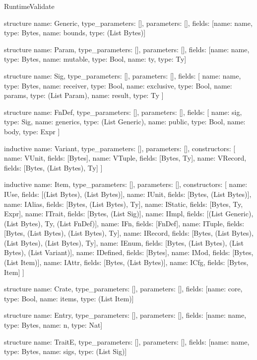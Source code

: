 \begin{lexlean}{RuntimeValidate}
\begin{semanticmodule}
structure{
  name: Generic,
  type_parameters: [],
  parameters: [],
  fields: [{name: name, type: Bytes}, {name: bounds, type: (List Bytes)}]
}

structure{
  name: Param,
  type_parameters: [],
  parameters: [],
  fields: [{name: name, type: Bytes}, {name: mutable, type: Bool}, {name: ty, type: Ty}]
}

structure{
  name: Sig,
  type_parameters: [],
  parameters: [],
  fields: [
    {name: name, type: Bytes},
    {name: receiver, type: Bool},
    {name: exclusive, type: Bool},
    {name: params, type: (List Param)},
    {name: result, type: Ty}
  ]
}

structure{
  name: FnDef,
  type_parameters: [],
  parameters: [],
  fields: [
    {name: sig, type: Sig},
    {name: generics, type: (List Generic)},
    {name: public, type: Bool},
    {name: body, type: Expr}
  ]
}

inductive{
  name: Variant,
  type_parameters: [],
  parameters: [],
  constructors: [
    {name: VUnit, fields: [Bytes]},
    {name: VTuple, fields: [Bytes, Ty]},
    {name: VRecord, fields: [Bytes, (List Bytes), Ty]}
  ]
}

inductive{
  name: Item,
  type_parameters: [],
  parameters: [],
  constructors: [
    {name: IUse, fields: [(List Bytes), (List Bytes)]},
    {name: IUnit, fields: [Bytes, (List Bytes)]},
    {name: IAlias, fields: [Bytes, (List Bytes), Ty]},
    {name: IStatic, fields: [Bytes, Ty, Expr]},
    {name: ITrait, fields: [Bytes, (List Sig)]},
    {name: IImpl, fields: [(List Generic), (List Bytes), Ty, (List FnDef)]},
    {name: IFn, fields: [FnDef]},
    {name: ITuple, fields: [Bytes, (List Bytes), (List Bytes), Ty]},
    {name: IRecord, fields: [Bytes, (List Bytes), (List Bytes), (List Bytes), Ty]},
    {name: IEnum, fields: [Bytes, (List Bytes), (List Bytes), (List Variant)]},
    {name: IDefined, fields: [Bytes]},
    {name: IMod, fields: [Bytes, (List Item)]},
    {name: IAttr, fields: [Bytes, (List Bytes)]},
    {name: ICfg, fields: [Bytes, Item]}
  ]
}

structure{
  name: Crate,
  type_parameters: [],
  parameters: [],
  fields: [{name: core, type: Bool}, {name: items, type: (List Item)}]
}

structure{
  name: Entry,
  type_parameters: [],
  parameters: [],
  fields: [{name: name, type: Bytes}, {name: n, type: Nat}]
}

structure{
  name: TraitE,
  type_parameters: [],
  parameters: [],
  fields: [{name: name, type: Bytes}, {name: sigs, type: (List Sig)}]
}


\end{semanticmodule}
\end{lexlean}
